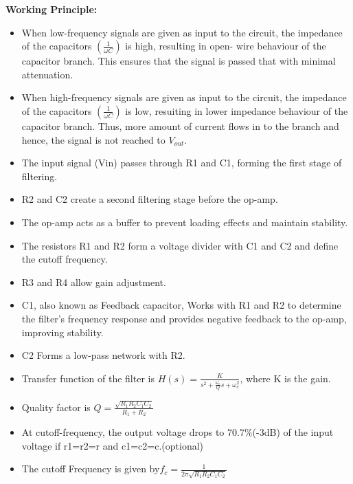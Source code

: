 \documentclass[a4paper,12pt]{article}
\begin{document}
\textbf{Working Principle:}
\begin{itemize}
    \item When low-frequency signals are given as input to the circuit, the impedance of the capacitors $(\frac{1}{\omega C})$ is high, resulting in open- wire behaviour of the capacitor branch. This ensures that the signal is passed  that with minimal attenuation. 
    \item When high-frequency signals are given as input to the circuit, the impedance of the capacitors $(\frac{1}{\omega C})$ is low, resuiting in lower impedance behaviour of the capacitor branch. Thus, more amount of current flows in to the branch and hence, the signal is not reached to $V_{out}$.
    \item The input signal (Vin) passes through R1 and C1, forming the first stage of filtering.
    \item R2 and C2 create a second filtering stage before the op-amp.
    \item The op-amp acts as a buffer to prevent loading effects and maintain stability.
    \item The resistors R1 and R2 form a voltage divider with C1 and C2 and define the cutoff frequency.
    \item R3 and R4 allow gain adjustment.
    \item C1, also known as Feedback capacitor, Works with R1 and R2 to determine the filter's frequency response and provides negative feedback to the op-amp, improving stability.
    \item C2 Forms a low-pass network with R2.
     \item Transfer function of the filter is $H(s) = \frac{K}{s^2 + \frac{\omega_c}{Q}s + \omega_c^2}$, where K is the gain.
     \item Quality factor is $Q = \frac{\sqrt{R_1 R_2 C_1 C_2}}{R_1 + R_2}$
    \item At cutoff-frequency, the output voltage drops to $70.7\%$(-3dB) of the input voltage if r1=r2=r and c1=c2=c.(optional)
    \item The cutoff Frequency is given by$  f_c=\frac{1}{2\pi\sqrt{ R_1R_2C_1C_2}}$
\end{itemize}
\end{document}
